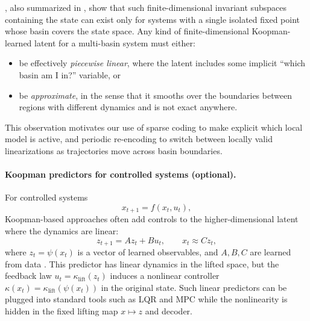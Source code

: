 \citet{lan_linearization_2013}, also summarized in \citet{brunton_koopman_2016}, show that such finite-dimensional invariant subspaces containing the state can exist only for systems with a single isolated fixed point whose basin covers the state space.
Any kind of finite-dimensional Koopman-learned latent for a multi-basin system must either:
\begin{itemize}
    \item be effectively \emph{piecewise linear}, where the latent includes some implicit ``which basin am I in?'' variable, or
    \item be \emph{approximate}, in the sense that it smooths over the boundaries between regions with different dynamics and is not exact anywhere.
\end{itemize}
This observation motivates our use of sparse coding to make explicit which local model is active, and periodic re-encoding to switch between locally valid linearizations as trajectories move across basin boundaries.



\paragraph{Koopman predictors for controlled systems (optional).}
For controlled systems
\begin{equation}
x_{t+1} = f(x_t, u_t),
\end{equation}
Koopman-based approaches often add controls to the higher-dimensional latent where the dynamics are linear:
\begin{equation}
z_{t+1} = A z_t + B u_t, \qquad x_t \approx C z_t,
\end{equation}
where $z_t = \psi(x_t)$ is a vector of learned observables, and $A,B,C$ are learned from data \citep{korda_linear_2018}.
This predictor has linear dynamics in the lifted space, but the feedback law $u_t = \kappa_{\mathrm{lift}}(z_t)$ induces a nonlinear controller $\kappa(x_t) = \kappa_{\mathrm{lift}}(\psi(x_t))$ in the original state.
Such linear predictors can be plugged into standard tools such as LQR and MPC while the nonlinearity is hidden in the fixed lifting map $x \mapsto z$ and decoder.

